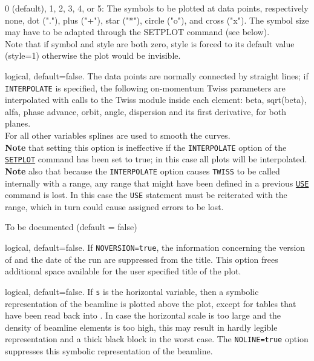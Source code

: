 \begin{madlist}
    0 (default), 1, 2, 3, 4, or 5: The symbols to be
     plotted at data points, respectively none, dot ("."), plus ("+"),
     star ("*"), circle ("o"), and cross ("x").  
     The symbol size may have to be adapted through the SETPLOT command
     (see below). \\ 
     Note that if symbol and style are both zero, style is
     forced to its default value (style=1) otherwise the plot would be
     invisible. 

    logical, default=false. The data points are
     normally connected by straight lines; if \texttt{INTERPOLATE} is
     specified, the following on-momentum Twiss parameters are
     interpolated with calls to the Twiss module inside 
     each element: beta, sqrt(beta), alfa, phase advance, orbit, angle,
     dispersion and its first derivative, for both planes. \\ 
     For all other variables splines are used to smooth
     the curves. \\ 
     \textbf{Note} that setting this option is ineffective if the
     \texttt{INTERPOLATE} option of the
     \hyperref[sec:setplot]{\texttt{SETPLOT}} command has been set to  
     true; in this case all plots will be interpolated. \\
     \textbf{Note} also that because the \texttt{INTERPOLATE} option
     causes \texttt{TWISS} to be called internally with a range, any
     range that might have been defined in a previous
     \hyperref[sec:use]{\texttt{USE}} command is lost. In this case the
     \texttt{USE} statement must be reiterated with the range, which in
     turn could cause assigned errors to be lost. 

    To be documented (default = false)

    logical, default=false. If \texttt{NOVERSION=true}, the
     information concerning the version of \madx and the date of the run
     are suppressed from the title.  
     This option frees additional space available for the user specified
     title of the plot.  

    logical, default=false. If \texttt{s} is the horizontal
     variable, then a symbolic representation of the beamline is plotted
     above the plot, except for tables that have been read back into \madx. 
     In case the horizontal scale is too large and the density of
     beamline elements is too high, this may result in hardly legible
     representation and a thick black block in the worst case. 
     The \texttt{NOLINE=true} option suppresses this symbolic representation 
     of the beamline. 


\end{madlist}
